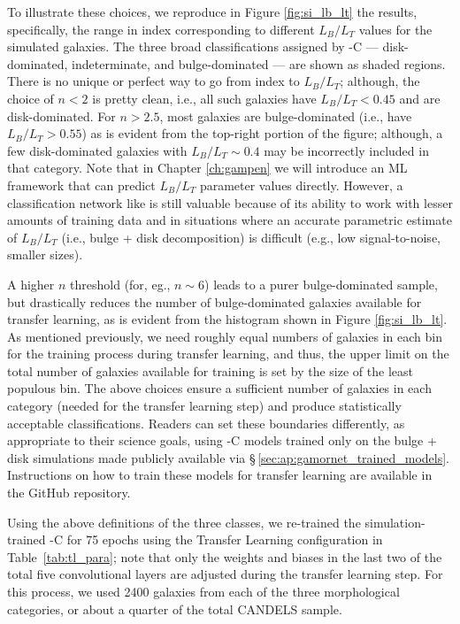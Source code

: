 To illustrate these choices, we reproduce in Figure \ref{fig:si_lb_lt} the \citet{simmons_08} results, specifically, the range in \sersic{} index corresponding to different $L_B/L_T$ values for the simulated galaxies. The three broad classifications assigned by \gamornet{}-C --- disk-dominated, indeterminate, and bulge-dominated --- are shown as shaded regions. There is no unique or perfect way to go from \sersic{} index to $L_B/L_T$; although, the choice of $n<2$ is pretty clean, i.e., all such galaxies have $L_B/L_T < 0.45$ and are disk-dominated. For $n>2.5$, most galaxies are bulge-dominated (i.e., have $L_B/L_T > 0.55$) as is evident from the top-right portion of the figure; although, a few disk-dominated galaxies with $L_B/L_T \sim 0.4$ may be incorrectly included in that category. Note that in Chapter \ref{ch:gampen} we will introduce an ML framework that can predict $L_B/L_T$ parameter values directly. However, a classification network like \gamornet{} is still valuable because of its ability to work with lesser amounts of training data and in situations where an accurate parametric estimate of $L_B/L_T$ (i.e., bulge + disk decomposition) is difficult (e.g., low signal-to-noise, smaller sizes). 
    
A higher $n$ threshold (for, eg., $n\sim6$) leads to a purer bulge-dominated sample, but drastically reduces the number of bulge-dominated galaxies available for transfer learning, as is evident from the histogram shown in Figure \ref{fig:si_lb_lt}. As mentioned previously, we need roughly equal numbers of galaxies in each bin for the training process during transfer learning, and thus, the upper limit on the total number of galaxies available for training is set by the size of the least populous bin. The above choices ensure a sufficient number of galaxies in each category (needed for the transfer learning step) and produce statistically acceptable classifications. Readers can set these boundaries differently, as appropriate to their science goals, using \gamornet{}-C models trained only on the bulge + disk simulations made publicly available via \S\,\ref{sec:ap:gamornet_trained_models}. Instructions on how to train these models for transfer learning are available in the GitHub repository.
    
Using the above definitions of the three classes, we re-trained the simulation-trained \gamornet{}-C for 75 epochs using the Transfer Learning configuration in Table~\ref{tab:tl_para}; note that only the weights and biases in the last two of the total five convolutional layers are adjusted during the transfer learning step. For this process, we used 2400 galaxies from each of the three morphological categories, or about a quarter of the total CANDELS sample.

